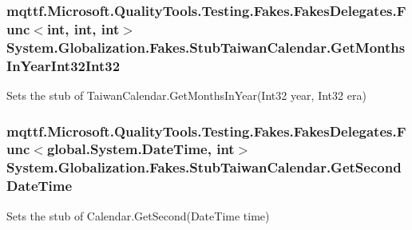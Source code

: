 \hypertarget{class_system_1_1_globalization_1_1_fakes_1_1_stub_taiwan_calendar_a2d66cec81d818cf77af03874db873d94}{
\subsubsection[{Get\-Months\-In\-Year\-Int32\-Int32}]{\setlength{\rightskip}{0pt plus 5cm}mqttf.\-Microsoft.\-Quality\-Tools.\-Testing.\-Fakes.\-Fakes\-Delegates.\-Func$<$int, int, int$>$ System.\-Globalization.\-Fakes.\-Stub\-Taiwan\-Calendar.\-Get\-Months\-In\-Year\-Int32\-Int32}}\label{class_system_1_1_globalization_1_1_fakes_1_1_stub_taiwan_calendar_a2d66cec81d818cf77af03874db873d94}


Sets the stub of Taiwan\-Calendar.\-Get\-Months\-In\-Year(\-Int32 year, Int32 era)

\hypertarget{class_system_1_1_globalization_1_1_fakes_1_1_stub_taiwan_calendar_a4106b3c8e29338e91e6310b8e2604203}{
\subsubsection[{Get\-Second\-Date\-Time}]{\setlength{\rightskip}{0pt plus 5cm}mqttf.\-Microsoft.\-Quality\-Tools.\-Testing.\-Fakes.\-Fakes\-Delegates.\-Func$<$global.\-System.\-Date\-Time, int$>$ System.\-Globalization.\-Fakes.\-Stub\-Taiwan\-Calendar.\-Get\-Second\-Date\-Time}}\label{class_system_1_1_globalization_1_1_fakes_1_1_stub_taiwan_calendar_a4106b3c8e29338e91e6310b8e2604203}


Sets the stub of Calendar.\-Get\-Second(\-Date\-Time time)

